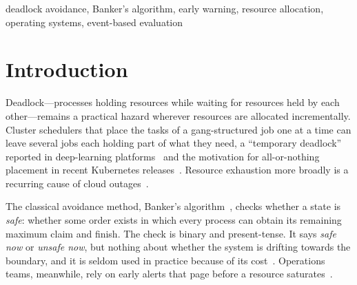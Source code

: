 \documentclass[conference]{IEEEtran}
\begin{document}
\begin{IEEEkeywords}
deadlock avoidance, Banker's algorithm, early warning, resource allocation, operating systems, event-based evaluation
\end{IEEEkeywords}

\section{Introduction}
Deadlock---processes holding resources while waiting for resources held by each other---remains a practical hazard wherever resources are allocated incrementally. Cluster schedulers that place the tasks of a gang-structured job one at a time can leave several jobs each holding part of what they need, a ``temporary deadlock'' reported in deep-learning platforms~\cite{Jayaram2019FfDL,Lin2019DRAGON} and the motivation for all-or-nothing placement in recent Kubernetes releases~\cite{K8sBlog2025}. Resource exhaustion more broadly is a recurring cause of cloud outages~\cite{Gunawi2016}.

The classical avoidance method, Banker's algorithm~\cite{Dijkstra-EWD123,Dijkstra-EWD623,Habermann1969}, checks whether a state is \emph{safe}: whether some order exists in which every process can obtain its remaining maximum claim and finish. The check is binary and present-tense. It says \emph{safe now} or \emph{unsafe now}, but nothing about whether the system is drifting towards the boundary, and it is seldom used in practice because of its cost~\cite{Belik1987}. Operations teams, meanwhile, rely on early alerts that page before a resource saturates~\cite{Ewaschuk2016SRE}.
\end{document}
